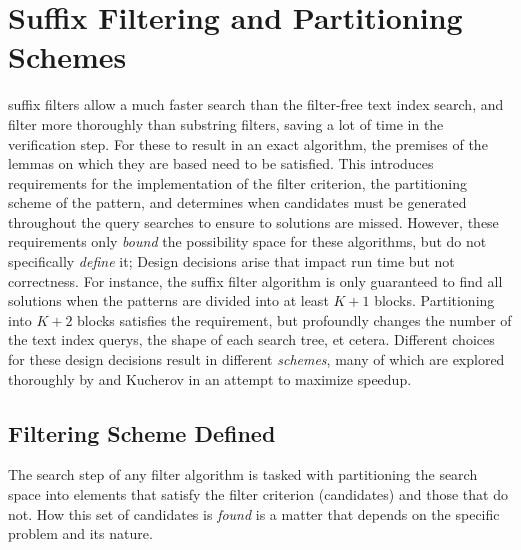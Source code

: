 \section{Suffix Filtering and Partitioning Schemes} \label{schemes}

\Glspl{suffix filter} allow a much faster search than the filter-free \gls{text index} search, and filter more thoroughly than \glspl{substring filter}, saving a lot of time in the \gls{verification step}. For these to result in an exact algorithm, the premises of the lemmas on which they are based need to be satisfied. This introduces requirements for the implementation of the \gls{filter criterion}, the \gls{partitioning scheme} of the \gls{pattern}, and determines when \glspl{candidate} must be generated throughout the \gls{query} searches to ensure to \glspl{solution} are missed. However, these requirements only \textit{bound} the possibility space for these algorithms, but do not specifically \textit{define} it; Design decisions arise that impact run time but not correctness. For instance, the suffix filter algorithm is only guaranteed to find all solutions when the patterns are divided into at least $K+1$ \glspl{block}. Partitioning into $K+2$ blocks satisfies the requirement, but profoundly changes the number of the text index \glspl{query}, the shape of each search tree, et cetera. Different choices for these design decisions result in different \textit{schemes}, many of which are explored thoroughly by \vali{} and Kucherov in an attempt to maximize speedup.



\subsection{Filtering Scheme Defined}
\label{schemes:def}

The \gls{search step} of any \gls{filter algorithm} is tasked with partitioning the search space into elements that satisfy the \gls{filter criterion} (\glspl{candidate}) and those that do not. How this set of candidates is \textit{found} is a matter that depends on the specific problem and its nature.
 
